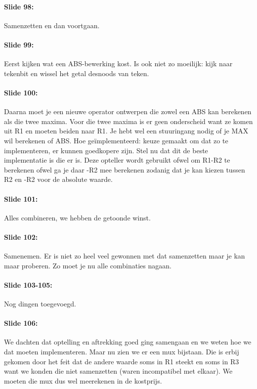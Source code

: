 \documentclass[10pt,a4paper]{book}
\begin{document}
\paragraph{Slide 98:} Samenzetten en dan voortgaan.

\paragraph{Slide 99:} Eerst kijken wat een ABS-bewerking kost. Is ook niet zo moeilijk: kijk naar tekenbit en wissel het getal desnoods van teken. 

\paragraph{Slide 100:} Daarna moet je een nieuwe operator ontwerpen die zowel een ABS kan berekenen als die twee maxima. Voor die twee maxima is er geen onderscheid want ze komen uit R1 en moeten beiden naar R1. Je hebt wel een stuuringang nodig of je MAX wil berekenen of ABS. Hoe ge\"implementeerd: keuze gemaakt om dat zo te implementeren, er kunnen goedkopere zijn. Stel nu dat dit de beste implementatie is die er is. Deze opteller wordt gebruikt ofwel om R1-R2 te berekenen ofwel ga je daar -R2 mee berekenen zodanig dat je kan kiezen tussen R2 en -R2 voor de absolute waarde.

\paragraph{Slide 101:} Alles combineren, we hebben de getoonde winst.

\paragraph{Slide 102:} Samenemen. Er is niet zo heel veel gewonnen met dat samenzetten maar je kan maar proberen. Zo moet je nu alle combinaties nagaan.

\paragraph{Slide 103-105:} Nog dingen toegevoegd.

\paragraph{Slide 106:} We dachten dat optelling en aftrekking goed ging samengaan en we weten hoe we dat moeten implementeren. Maar nu zien we er een mux bijstaan. Die is erbij gekomen door het feit dat de andere waarde soms in R1 steekt en soms in R3 want we konden die niet samenzetten (waren incompatibel met elkaar). We moeten die mux dus wel meerekenen in de kostprijs.
\end{document}
